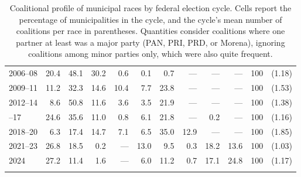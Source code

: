 \documentclass[letter,12pt]{article}
\begin{document}
\begin{table}
{\begin{tabular}{lrrrrrrrrrrc}
 2006--08&  20.4&  48.1&   30.2&    0.6&    0.1&       0.7&         ---&  ---&       ---& 100 & (1.18) \\
 2009--11&  11.2&  32.3&   14.6&   10.4&    7.7&      23.8&         ---&  ---&       ---& 100 & (1.53) \\
 2012--14&   8.6&  50.8&   11.6&    3.6&    3.5&      21.9&         ---&  ---&       ---& 100 & (1.38) \\ \hdashline
 2015--17&  24.6&  35.6&   11.0&    0.8&    6.1&      21.8&         ---&  0.2&       ---& 100 & (1.16) \\
 2018--20&   6.3&  17.4&   14.7&    7.1&    6.5&      35.0&        12.9&  ---&       ---& 100 & (1.85) \\
 2021--23&  26.8&  18.5&    0.2&    ---&   13.0&       9.5&         0.3& 18.2&      13.6& 100 & (1.03) \\
 2024    &  27.2&  11.4&    1.6&    ---&    6.0&      11.2&         0.7& 17.1&      24.8& 100 & (1.17) \\ 
     &      &      &       &       &       &          &            &     &          &       &        \\ [-1.8ex] 
  \hline
\end{tabular}
}
\caption{Coalitional profile of municipal races by federal election cycle. Cells report the percentage of municipalities in the cycle, and the cycle's mean number of coalitions per race in parentheses. Quantities consider coalitions where one partner at least was a major party (PAN, PRI, PRD, or Morena), ignoring coalitions among minor parties only, which were also quite frequent.}\label{T:coal}
\end{table}
\end{document}
